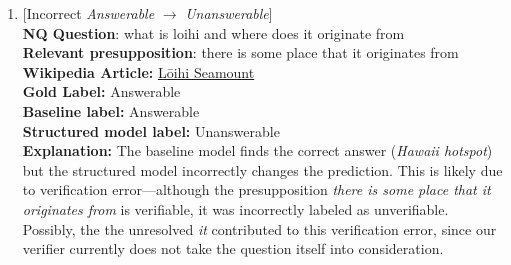 \documentclass[11pt,a4paper]{article}
\begin{document}
\begin{enumerate}
    \item  {[Incorrect \textit{Answerable} $\rightarrow$ \textit{Unanswerable}]} \\
    \textbf{NQ Question}: what is loihi and where does it originate from \\
    \textbf{Relevant presupposition}: there is some place that it originates from \\
    \textbf{Wikipedia Article:} \href{https://en.wikipedia.org//w/index.php?title=L%C5%8D%CA%BBihi_Seamount}{L\={o}ihi Seamount
} \\
    \textbf{Gold Label:} Answerable \\
    \textbf{Baseline label:} Answerable \\
    \textbf{Structured model label:} Unanswerable \\
    \textbf{Explanation:} The baseline model finds the correct answer (\textit{Hawaii hotspot}) but the structured model incorrectly changes the prediction. This is likely due to verification error---although the presupposition \textit{there is some place that it originates from} is verifiable, it was incorrectly labeled as unverifiable. Possibly, the the unresolved \textit{it} contributed to this verification error, since our verifier currently does not take the question itself into consideration. 

\end{enumerate}
    
\end{document}
